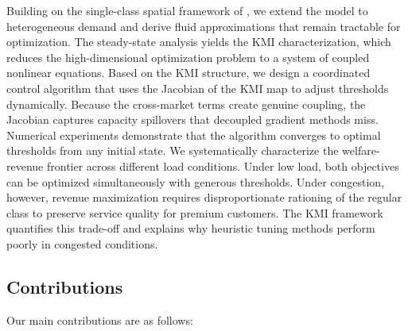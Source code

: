 Building on the single-class spatial framework of \citet{WangZhangHu2024}, we extend the model to heterogeneous demand and derive fluid approximations that remain tractable for optimization.
The steady-state analysis yields the KMI characterization, which reduces the high-dimensional optimization problem to a system of coupled nonlinear equations.
Based on the KMI structure, we design a coordinated control algorithm that uses the Jacobian of the KMI map to adjust thresholds dynamically.
Because the cross-market terms create genuine coupling, the Jacobian captures capacity spillovers that decoupled gradient methods miss.
Numerical experiments demonstrate that the algorithm converges to optimal thresholds from any initial state.
We systematically characterize the welfare-revenue frontier across different load conditions.
Under low load, both objectives can be optimized simultaneously with generous thresholds.
Under congestion, however, revenue maximization requires disproportionate rationing of the regular class to preserve service quality for premium customers.
The KMI framework quantifies this trade-off and explains why heuristic tuning methods perform poorly in congested conditions.


\subsection{Contributions}

Our main contributions are as follows:


